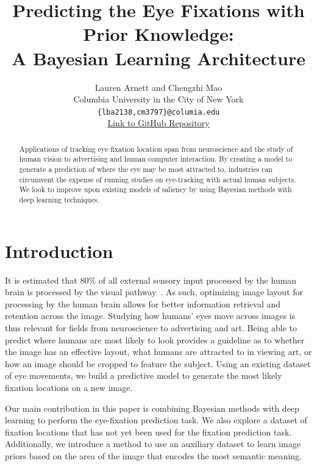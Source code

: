 \documentclass[10pt,twocolumn,letterpaper]{article}
\begin{document}
\title{Predicting the Eye Fixations with Prior Knowledge: \\A Bayesian Learning Architecture}

\author{Lauren Arnett and Chengzhi Mao\\
Columbia University in the City of New York\\
    {\tt\small \{lba2138,cm3797\}@columia.edu}
    \\\href{https://github.com/laurenarnett/eye-movements}{\small\color{blue} Link to GitHub
    Repository}
}

\maketitle

\begin{abstract} 
    
    Applications of tracking eye fixation location span from neuroscience and
    the study of human vision to advertising and human computer interaction. By
    creating a model to generate a prediction of where the eye may be most
    attracted to, industries can circumvent the expense of running studies on
    eye-tracking with actual human subjects. We look to improve upon existing
    models of saliency by using Bayesian methods with deep learning techniques.

\end{abstract}

\section{Introduction} It is estimated that 80\% of all external sensory input
processed by the human brain is processed by the visual pathway~\cite{Jerath}.
As such, optimizing image layout for processing by the human brain allows for
better information retrieval and retention across the image. Studying how
humans’ eyes move across images is thus relevant for fields from neuroscience
to advertising and  art. Being able to predict where humans are most likely to
look provides a guideline as to whether the image has an effective layout, what
humans are attracted to in viewing art, or how an image should be cropped to
feature the subject. Using an existing dataset of eye movements, we build
a predictive model to generate the most likely fixation locations on a new
image.

Our main contribution in this paper is combining Bayesian methods with deep
learning to perform the eye-fixation prediction task. We also explore a dataset
of fixation locations that has not yet been used for the fixation prediction
task. Additionally, we introduce a method to use an auxiliary dataset to learn
image priors based on the area of the image that encodes the most semantic
meaning. 
\end{document}

